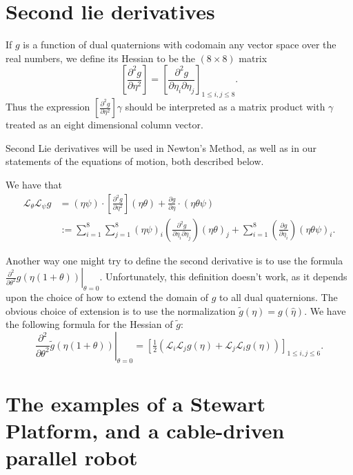 \documentclass[reqno,12pt]{amsart}
\newcommand{\liederiv}{\mathcal L}
\begin{document}
\section{Second lie derivatives}

If $g$ is a function of dual quaternions with codomain any vector space over the real numbers, we define its Hessian to be the $(8 \times 8)$ matrix
\begin{equation}
\left[\frac{\partial^2 g}{\partial \eta^2}\right] = \left[\frac{\partial^2 g}{\partial \eta_i\partial \eta_j}\right] _{ 1 \le i,j \le 8 }.
\end{equation}
Thus the expression $\left[\frac{\partial^2 g}{\partial \eta^2}\right] \gamma$ should be interpreted as a matrix product with $\gamma$ treated as an eight dimensional column vector.

Second Lie derivatives will be used in Newton's Method, as well as in our statements of the equations of motion, both described below.

We have that
\begin{equation}
\label{second lie deriv}
\begin{aligned}
\liederiv_\theta \liederiv_\psi g &= (\eta \psi) \cdot \left[\frac{\partial^2 g}{\partial \eta^2}\right](\eta \theta) + \frac{\partial g}{\partial \eta} \cdot (\eta \theta \psi) \\
&:= \sum_{i=1}^8 \sum_{j=1}^8 (\eta \psi)_i \left(\frac{\partial^2 g}{\partial \eta_i \partial \eta_j}\right)(\eta \theta)_j + \sum_{i=1}^8 \left(\frac{\partial g}{\partial \eta_i}\right) (\eta \theta \psi)_i .
\end{aligned}
\end{equation}

Another way one might try to define the second derivative is to use the formula $\left.\frac {\partial^2}{\partial\theta^2} g(\eta(1+\theta)) \right | _{\theta=0}$.  Unfortunately, this definition doesn't work, as it depends upon the choice of how to extend the domain of $g$ to all dual quaternions.  The obvious choice of extension is to use the normalization $\tilde g(\eta) = g(\hat\eta)$.  We have the following formula for the Hessian of $\tilde g$:
\begin{equation}
\label{hessian}
\left.\frac{\partial^2}{\partial\theta^2} \tilde g(\eta(1+\theta)) \right|_{\theta = 0} = \left[\tfrac12 (\liederiv_i \liederiv_j g(\eta) + \liederiv_j \liederiv_i g(\eta)) \right]_{1\le i,j\le 6}.
\end{equation}

\section{The examples of a Stewart Platform, and a cable-driven parallel robot}
\label{section examples}
\end{document}
